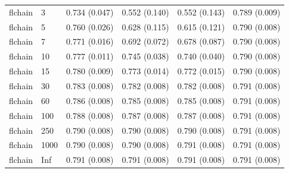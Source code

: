 \begin{tabular}{llllll}
  flchain & 3 & 0.734 (0.047) & 0.552 (0.140) & 0.552 (0.143) & 0.789 (0.009) \\ 
  flchain & 5 & 0.760 (0.026) & 0.628 (0.115) & 0.615 (0.121) & 0.790 (0.008) \\ 
  flchain & 7 & 0.771 (0.016) & 0.692 (0.072) & 0.678 (0.087) & 0.790 (0.008) \\ 
  flchain & 10 & 0.777 (0.011) & 0.745 (0.038) & 0.740 (0.040) & 0.790 (0.008) \\ 
  flchain & 15 & 0.780 (0.009) & 0.773 (0.014) & 0.772 (0.015) & 0.790 (0.008) \\ 
  flchain & 30 & 0.783 (0.008) & 0.782 (0.008) & 0.782 (0.008) & 0.791 (0.008) \\ 
  flchain & 60 & 0.786 (0.008) & 0.785 (0.008) & 0.785 (0.008) & 0.791 (0.008) \\ 
  flchain & 100 & 0.788 (0.008) & 0.787 (0.008) & 0.787 (0.008) & 0.791 (0.008) \\ 
  flchain & 250 & 0.790 (0.008) & 0.790 (0.008) & 0.790 (0.008) & 0.791 (0.008) \\ 
  flchain & 1000 & 0.790 (0.008) & 0.790 (0.008) & 0.791 (0.008) & 0.791 (0.008) \\ 
  flchain & Inf & 0.791 (0.008) & 0.791 (0.008) & 0.791 (0.008) & 0.791 (0.008) \\ 
   \bottomrule
\end{tabular}
